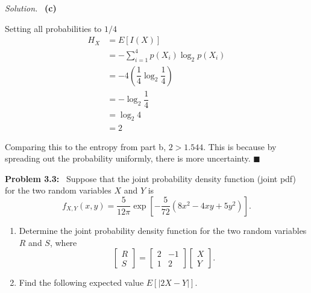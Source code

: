 \documentclass[11pt]{article}
\newenvironment{problem}[1]
{\par\bigskip\noindent\textbf{Problem #1:}\ }
{\par}
\newenvironment{solution}
{\par\medskip\noindent\textit{Solution.}\ }
{\hfill$\blacksquare$\par\medskip}
\begin{document}
\begin{solution}
        \vspace{1em}
        \textbf{(c)}

        Setting all probabilities to $1/4$
        \begin{align*}
            H_X &= E[I(X)] \\
            &= - \sum_{i = 1}^{4} p(X_i) \log_2{ p(X_i) } \\
            &= - 4 (\dfrac{1}{4} \log_2{\dfrac{1}{4}}) \\
            &= - \log_2{\dfrac{1}{4}} \\
            &= \log_2{4} \\
            &= 2
        \end{align*}

        Comparing this to the entropy from part b, $2 > 1.544$.
        This is because by spreading out the probability uniformly, there is more uncertainty.
    \end{solution}

    \begin{problem}{3.3}
Suppose that the joint probability density function (joint pdf) for the two
random variables $X$ and $Y$ is
\[
    f_{X,Y}(x,y) = \frac{5}{12\pi}\exp\!\left[-\frac{5}{72}\left(8x^2 - 4xy + 5y^2\right)\right].
\]
\begin{enumerate}[label=(\alph*)]
  \item Determine the joint probability density function for the two random
  variables $R$ and $S$, where
  \[
      \begin{bmatrix}
                  R \\ S
      \end{bmatrix}
      = \begin{bmatrix}
                    2 & -1 \\ 1 & 2
      \end{bmatrix}
      \begin{bmatrix}
                  X \\ Y
      \end{bmatrix}.
  \]
  \item Find the following expected value $E[|2X - Y|]$.
\end{enumerate}
    \end{problem}
\end{document}
